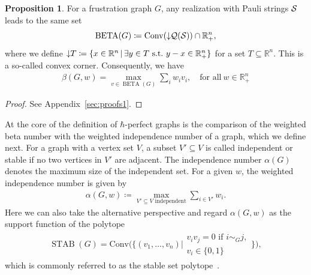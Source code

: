 \documentclass[
12pt,
prx,
aps,
reprint,
a4paper,
longbibliograph,
nofootinbib,
nobibnotes,
superscriptaddress
]{revtex4-2}
\theoremstyle{definition}
\newtheorem{proposition}{Proposition}
\def\conv{\mathrm{Conv}}
\def\stab{\operatorname{STAB}}
\def\be{\operatorname{BETA}}
\begin{document}
\begin{proposition}
\label{ob:beta}
For a frustration graph $G$, any realization with Pauli strings ${\cal S}$ leads to the same set
\begin{equation}
	\be(G) \coloneqq \conv(\downarrow\hspace{-0.3em} {\cal Q}({\cal S})) \cap \mathbb{R}_+^n,
\end{equation}
where we define $\downarrow\hspace{-0.3em}T \coloneqq \{x \in \mathbb{R}^n \,|\,\exists y \in T\ \mathrm{s.t.}\ y - x \in \mathbb{R}_+^n\}$ for a set $T \subseteq \mathbb{R}^n$. This is a so-called convex corner. 
Consequently, we have
\begin{align}
        \beta(G,w) = \max_{v\in \be(G)} \sum_i w_i v_i, \quad \text{for all} \  w\in \mathbb{R}_+^n
\end{align}
\end{proposition}	
\begin{proof}
See Appendix~\ref{sec:proofs1}.
\end{proof}
At the core of the definition of $\hbar$-perfect graphs is the comparison of the weighted beta number with the weighted independence number of a graph, which we define next. For a graph with a vertex set $V$, a subset $V' \subseteq V$ is called independent or stable if no two vertices in $V'$ are adjacent. The independence number $\alpha(G)$ denotes the maximum size of the independent set. For a given $w$, the weighted independence number is given by 
\begin{align}
    \alpha(G,w)\coloneqq\max_{V'\subseteq V \text{ independent}}   \sum\nolimits_{i\in V'} w_i.
\end{align}
Here we can also take the alternative perspective and regard $\alpha(G,w)$ as the support function of the polytope  
\begin{align}
    \stab(G)=\conv\bigl( \{(v_1,\dots,v_n)| \substack{ v_iv_j=0  \text{ if } i\sim_G j ,\\ v_i\in\{0,1\} } \} \bigr),
\end{align}
which is commonly referred to as the stable set polytope~\cite{lovasz2019Graphs}. 
\end{document}
